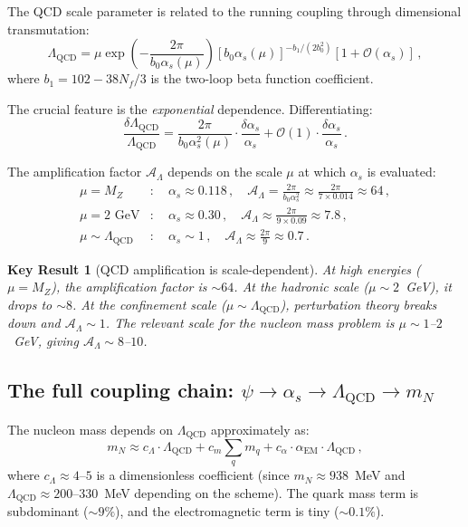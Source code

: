 \documentclass[aps,prd,twocolumn,superscriptaddress,floatfix,nofootinbib]{revtex4-2}
\renewcommand{\order}[1]{\mathcal{O}\!\left(#1\right)}
\newcommand{\LQCD}{\Lambda_{\mathrm{QCD}}}
\newcommand{\as}{\alpha_s}
\newcommand{\aem}{\alpha_{\mathrm{EM}}}
\newcommand{\mN}{m_N}
\newtheorem{result}{Key Result}
\begin{document}
The QCD scale parameter is related to the running coupling through dimensional
transmutation:
\begin{equation}
\LQCD = \mu \exp\!\left( -\frac{2\pi}{b_0 \as(\mu)} \right)
\left[ b_0 \as(\mu) \right]^{-b_1/(2b_0^2)} \left[ 1 + \order{\as} \right] \, ,
\label{eq:LQCD_def}
\end{equation}
where $b_1 = 102 - 38 N_f/3$ is the two-loop beta function coefficient.

The crucial feature is the \emph{exponential} dependence. Differentiating:
\begin{equation}
\frac{\delta\LQCD}{\LQCD} = \frac{2\pi}{b_0 \as^2(\mu)} \cdot
\frac{\delta\as}{\as} + \order{1} \cdot \frac{\delta\as}{\as} \, .
\label{eq:LQCD_sensitivity}
\end{equation}

The amplification factor $\mathcal{A}_\Lambda$ depends on the scale $\mu$ at
which $\as$ is evaluated:
\begin{align}
\mu = M_Z &: \quad \as \approx 0.118 \, , \quad \mathcal{A}_\Lambda =
\frac{2\pi}{b_0 \as^2} \approx \frac{2\pi}{7 \times 0.014} \approx 64 \, ,
\label{eq:amp_MZ} \\
\mu = 2\text{ GeV} &: \quad \as \approx 0.30 \, , \quad \mathcal{A}_\Lambda
\approx \frac{2\pi}{9 \times 0.09} \approx 7.8 \, , \label{eq:amp_2GeV} \\
\mu \sim \LQCD &: \quad \as \sim 1 \, , \quad \mathcal{A}_\Lambda \approx
\frac{2\pi}{9} \approx 0.7 \, . \label{eq:amp_LQCD}
\end{align}

\begin{result}[QCD amplification is scale-dependent]
At high energies ($\mu = M_Z$), the amplification factor is $\sim 64$. At the
hadronic scale ($\mu \sim 2$~GeV), it drops to $\sim 8$. At the confinement
scale ($\mu \sim \LQCD$), perturbation theory breaks down and
$\mathcal{A}_\Lambda \sim 1$. The relevant scale for the nucleon mass
problem is $\mu \sim 1$--$2$~GeV, giving $\mathcal{A}_\Lambda \sim 8$--$10$.
\end{result}

\subsection{The full coupling chain: $\psi \to \as \to \LQCD \to \mN$}

The nucleon mass depends on $\LQCD$ approximately as:
\begin{equation}
\mN \approx c_\Lambda \cdot \LQCD + c_m \sum_q m_q + c_\alpha \cdot \aem \cdot
\LQCD \, ,
\label{eq:mN_LQCD}
\end{equation}
where $c_\Lambda \approx 4$--$5$ is a dimensionless coefficient (since $\mN
\approx 938$~MeV and $\LQCD \approx 200$--$330$~MeV depending on the scheme).
The quark mass term is subdominant ($\sim 9\%$), and the electromagnetic term is
tiny ($\sim 0.1\%$).
\end{document}
